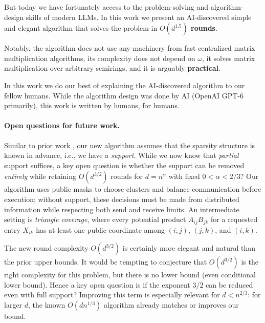 But today we have fortunately access to the problem-solving and algorithm-design skills of modern LLMs. In this work we present an AI-discovered simple and elegant algorithm that solves the problem in \textbf{\boldmath $O(d^{1.5})$ rounds}.

Notably, the algorithm does not use any machinery from fast centralized matrix multiplication algorithms, its complexity does not depend on $\omega$, it solves matrix multiplication over arbitrary semirings, and it is arguably \textbf{practical}.

In this work we do our best of explaining the AI-discovered algorithm to our fellow humans. While the algorithm design was done by AI (OpenAI GPT-6 primarily), this work is written by humans, for humans.


\paragraph{Open questions for future work.}

Similar to prior work \cite{gupta-hirvonen-etal-2022-sparse-matrix-multiplication,gupta-korhonen-etal-2025-low-bandwidth-matrix}, our new algorithm assumes that the sparsity structure is known in advance, i.e., we have a \emph{support}. While we now know that \emph{partial} support suffices, a key open question is whether the support can be removed \emph{entirely} while
retaining $O(d^{3/2})$ rounds for $d=n^\alpha$ with fixed $0<\alpha<2/3$?
Our algorithm uses public masks to choose clusters and balance communication
before execution; without support, these decisions must be made from
distributed information while respecting both send and receive limits.
An intermediate setting is \emph{triangle coverage}, where every potential
product $A_{ij}B_{jk}$ for a requested entry $X_{ik}$ has at least one public
coordinate among $(i,j)$, $(j,k)$, and $(i,k)$.

The new round complexity $O(d^{3/2})$ is certainly more elegant and natural than the prior upper bounds. It would be tempting to conjecture that $O(d^{3/2})$ is the right complexity for this problem, but there is no lower bound (even conditional lower bound). Hence a key open question is if the exponent $3/2$ can be reduced even with full support?
Improving this term is especially relevant for $d<n^{2/3}$: for larger $d$,
the known $O(dn^{1/3})$ algorithm already matches or improves our bound.

